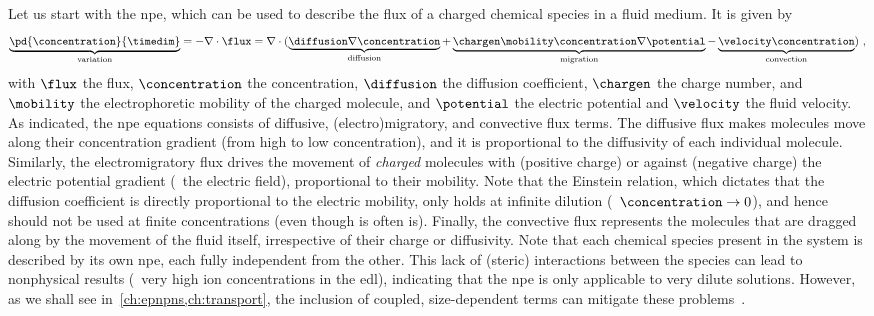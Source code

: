 Let us start with the \gls{npe}, which can be used to describe the flux of a charged chemical species in a
fluid medium. It is given by~\cite{Lu-2011}
%
\begin{equation}\label{eq:nanopores_nernst_planck}
  \underbrace{ \pd{\concentration}{\timedim} }_{\text{variation}}
  = - \nabla \cdot \flux = \nabla \cdot (
    \underbrace{ \diffusion \nabla \concentration }_{\text{diffusion}}
    +
    \underbrace { \chargen \mobility \concentration \nabla \potential }_{\text{migration}}
    -
    \underbrace{\velocity \concentration}_{\text{convection}}
    )
  \text{ ,}
\end{equation}
%
with $\flux$ the flux, $\concentration$ the concentration, $\diffusion$ the diffusion coefficient, $\chargen$
the charge number, and $\mobility$ the electrophoretic mobility of the charged molecule, and $\potential$ the
electric potential and $\velocity$ the fluid velocity. As indicated, the \gls{npe} equations consists of
diffusive, (electro)migratory, and convective flux terms. The diffusive flux makes molecules move along their
concentration gradient (from high to low concentration), and it is proportional to the diffusivity of each
individual molecule. Similarly, the electromigratory flux drives the movement of \emph{charged} molecules with
(positive charge) or against (negative charge) the electric potential gradient (\ie~the electric field),
proportional to their mobility. Note that the Einstein relation\footnotemark{},%
%
%
which dictates that the diffusion coefficient is directly proportional to the electric mobility, only holds at
infinite dilution (\ie~$\concentration \to 0$), and hence should not be used at finite concentrations (even
though is often is). Finally, the convective flux represents the molecules that are dragged along by the
movement of the fluid itself, irrespective of their charge or diffusivity. Note that each chemical species
present in the system is described by its own \gls{npe}, each fully independent from the other. This lack of
(steric) interactions between the species can lead to nonphysical results (\ie~very high ion concentrations in
the \gls{edl}), indicating that the \gls{npe} is only applicable to very dilute solutions. However, as we
shall see in~\cref{ch:epnpns,ch:transport}, the inclusion of coupled, size-dependent terms can mitigate these
problems~\cite{Lu-2011}.

